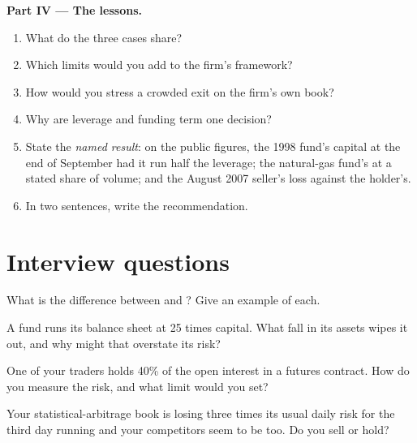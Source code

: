 \begin{problem}
\medskip\noindent\textbf{Part IV --- The lessons.}
\begin{enumerate}[resume]
\item What do the three cases share?
\item Which limits would you add to the firm's framework?
\item How would you stress a crowded exit on the firm's own book?
\item Why are leverage and funding term one decision?
\item State the \emph{named result}: on the public figures, the 1998 fund's capital at the end of September had it run half the leverage; the
natural-gas fund's  at a stated share of volume; and the August 2007 seller's loss against the holder's.
\item In two sentences, write the recommendation.
\end{enumerate}
\end{problem}

\section{Interview questions}

\begin{interviewq}\label{iq:fm:case-studies-i:1}
What is the difference between  and ? Give an example of each.
\end{interviewq}

\begin{interviewq}\label{iq:fm:case-studies-i:2}
A fund runs its balance sheet at 25 times capital. What fall in its assets wipes it out, and why might that overstate its risk?
\end{interviewq}

\begin{interviewq}\label{iq:fm:case-studies-i:3}
One of your traders holds 40\% of the open interest in a futures contract. How do you measure the risk, and what limit would you set?
\end{interviewq}

\begin{interviewq}\label{iq:fm:case-studies-i:4}
Your statistical-arbitrage book is losing three times its usual daily risk for the third day running and your competitors seem to be too. Do you
sell or hold?
\end{interviewq}

